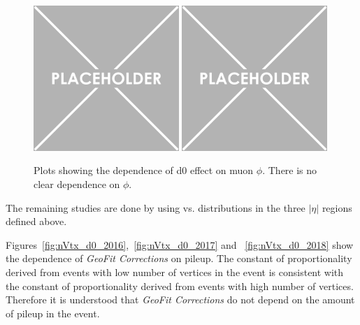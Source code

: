 \begin{figure}[h!]
    \centering
    \includegraphics[width=0.49\textwidth]{images_geofit/dimu_mass_vs_phi_MC.png}
    \includegraphics[width=0.49\textwidth]{images_geofit/dimu_mass_vs_phi_data.png}
    \caption{Plots showing the dependence of d0 effect on muon $\phi$. There is no clear dependence on $\phi$.}
    \label{fig:2D_d0_phi}
\end{figure}

The remaining studies are done by using \dptoverptsquare vs. \dzeroBS distributions in the three $|\eta|$ regions defined above.

Figures~\ref{fig:nVtx_d0_2016},~\ref{fig:nVtx_d0_2017} and ~\ref{fig:nVtx_d0_2018} show the dependence of \textit{GeoFit Corrections} on pileup. The constant of proportionality derived from events with low number of vertices in the event is consistent with the constant of proportionality derived from events with high number of vertices. Therefore it is understood that \textit{GeoFit Corrections} do not depend on the amount of pileup in the event.

